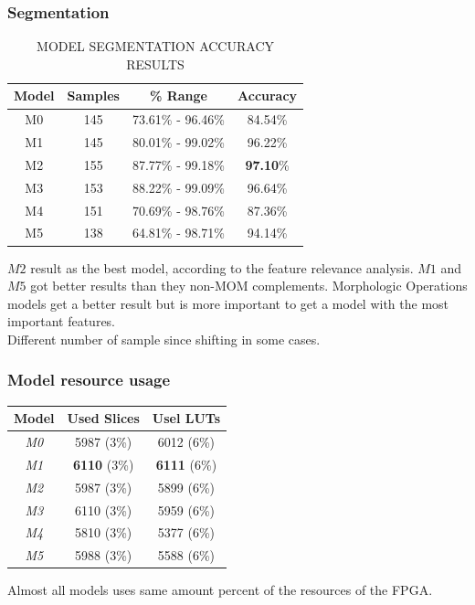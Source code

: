 \documentclass[
serif,
compress,
xcolor=table,
dvipsnames,
]{beamer}
\begin{document}
\begin{frame}
\frametitle{Segmentation}


    \begin{table}[h]
\centering
\caption*{MODEL SEGMENTATION ACCURACY RESULTS}
    \begin{tabular}{|c|c|c|c|}
    \hline
    Model &  Samples  & \% Range & Accuracy \\
    \hline
    M0 &  145 & 73.61\% - 96.46\%  & 84.54\%\\
    \hline
    M1 &  145 & 80.01\% - 99.02\% & 96.22\%\\
        \hline
    M2 &  155 & 87.77\% - 99.18\% & \textbf{97.10}\%\\
        \hline
    M3 &  153 & 88.22\% - 99.09\% & 96.64\%\\
        \hline
    M4 &  151 & 70.69\% - 98.76\% & 87.36\%\\
        \hline
    M5 &  138 & 64.81\% - 98.71\% & 94.14\%\\
        \hline
    
    \end{tabular}
    \label{secomp}
\end{table}

$M2$ result as the best model, according to the feature relevance analysis. $M1$ and $M5$ got better results than they non-MOM complements. Morphologic Operations models get a better result  but is more important to get a model with the most important features.\\
Different number of sample since shifting in some cases.

\end{frame}

\begin{frame}
\frametitle{Model resource usage}
\begin{table}[ht]
\centering
\begin{tabular}{|c|c|c|}
\hline


\textbf{Model}       & \textbf{Used Slices } & \textbf{Usel LUTs} \\ \hline
\textit{M0} & 5987 (3\%)  & 6012 (6\%) \\ \hline
\textit{M1} & \textbf{6110} (3\%)  & \textbf{6111} (6\%) \\ \hline
\textit{M2} & 5987 (3\%)  & 5899 (6\%) \\ \hline
\textit{M3} & 6110 (3\%)  & 5959 (6\%) \\ \hline
\textit{M4} & 5810 (3\%)  & 5377 (6\%) \\ \hline
\textit{M5} & 5988 (3\%)  & 5588 (6\%) \\ \hline
\end{tabular}
\label{res}
\end{table}

Almost all models uses same amount percent of the resources of the FPGA. 

\end{frame}
\end{document}
